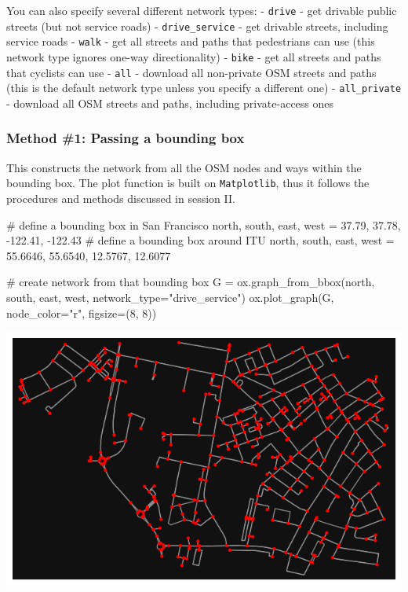 \documentclass[
  letterpaper,
  DIV=11,
  numbers=noendperiod]{scrreprt}
\newenvironment{Shaded}{\begin{snugshade}}{\end{snugshade}}
\newcommand{\CommentTok}[1]{\textcolor[rgb]{0.37,0.37,0.37}{#1}}
\newcommand{\DecValTok}[1]{\textcolor[rgb]{0.68,0.00,0.00}{#1}}
\newcommand{\FloatTok}[1]{\textcolor[rgb]{0.68,0.00,0.00}{#1}}
\newcommand{\NormalTok}[1]{\textcolor[rgb]{0.00,0.23,0.31}{#1}}
\newcommand{\OperatorTok}[1]{\textcolor[rgb]{0.37,0.37,0.37}{#1}}
\newcommand{\StringTok}[1]{\textcolor[rgb]{0.13,0.47,0.30}{#1}}
\begin{document}
You can also specify several different network types: - \texttt{drive} -
get drivable public streets (but not service roads) -
\texttt{drive\_service} - get drivable streets, including service roads
- \texttt{walk} - get all streets and paths that pedestrians can use
(this network type ignores one-way directionality) - \texttt{bike} - get
all streets and paths that cyclists can use - \texttt{all} - download
all non-private OSM streets and paths (this is the default network type
unless you specify a different one) - \texttt{all\_private} - download
all OSM streets and paths, including private-access ones

\subsubsection{Method \#1: Passing a bounding
box}\label{method-1-passing-a-bounding-box}

This constructs the network from all the OSM nodes and ways within the
bounding box. The plot function is built on \texttt{Matplotlib}, thus it
follows the procedures and methods discussed in session II.

\begin{Shaded}
\begin{Highlighting}[]
\CommentTok{\# define a bounding box in San Francisco}
\NormalTok{north, south, east, west }\OperatorTok{=} \FloatTok{37.79}\NormalTok{, }\FloatTok{37.78}\NormalTok{, }\OperatorTok{{-}}\FloatTok{122.41}\NormalTok{, }\OperatorTok{{-}}\FloatTok{122.43}
\CommentTok{\# define a bounding box around ITU}
\NormalTok{north, south, east, west }\OperatorTok{=} \FloatTok{55.6646}\NormalTok{, }\FloatTok{55.6540}\NormalTok{, }\FloatTok{12.5767}\NormalTok{, }\FloatTok{12.6077}

\CommentTok{\# create network from that bounding box}
\NormalTok{G }\OperatorTok{=}\NormalTok{ ox.graph\_from\_bbox(north, south, east, west, network\_type}\OperatorTok{=}\StringTok{"drive\_service"}\NormalTok{)}
\NormalTok{ox.plot\_graph(G, node\_color}\OperatorTok{=}\StringTok{"r"}\NormalTok{, figsize}\OperatorTok{=}\NormalTok{(}\DecValTok{8}\NormalTok{, }\DecValTok{8}\NormalTok{))}
\end{Highlighting}
\end{Shaded}

\includegraphics{labs/w07_OSM_files/figure-pdf/cell-6-output-1.png}
\end{document}
